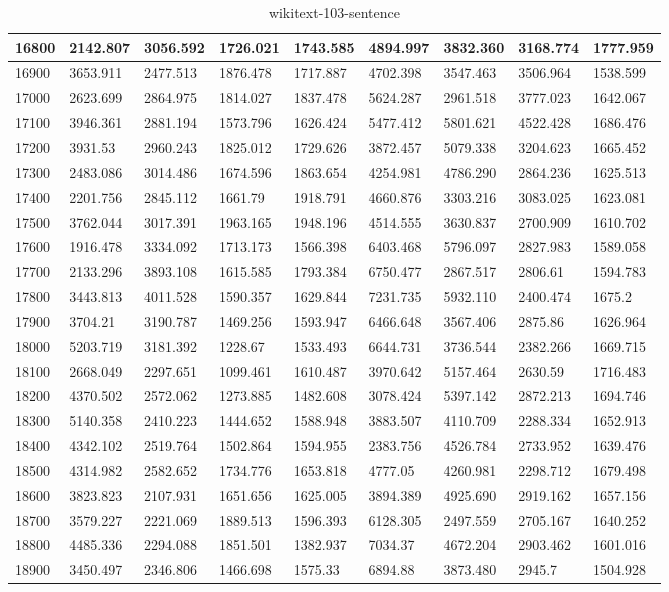 \begin{table}[]
{\begin{tabular}{|l|l|l|l|l|l|l|l|l|}
16800 & 2142.807 & 3056.592 & 1726.021 & 1743.585 & 4894.997 & 3832.360 & 3168.774 & 1777.959 \\ \hline
16900 & 3653.911 & 2477.513 & 1876.478 & 1717.887 & 4702.398 & 3547.463 & 3506.964 & 1538.599 \\ \hline
17000 & 2623.699 & 2864.975 & 1814.027 & 1837.478 & 5624.287 & 2961.518 & 3777.023 & 1642.067 \\ \hline
17100 & 3946.361 & 2881.194 & 1573.796 & 1626.424 & 5477.412 & 5801.621 & 4522.428 & 1686.476 \\ \hline
17200 & 3931.53 & 2960.243 & 1825.012 & 1729.626 & 3872.457 & 5079.338 & 3204.623 & 1665.452 \\ \hline
17300 & 2483.086 & 3014.486 & 1674.596 & 1863.654 & 4254.981 & 4786.290 & 2864.236 & 1625.513 \\ \hline
17400 & 2201.756 & 2845.112 & 1661.79 & 1918.791 & 4660.876 & 3303.216 & 3083.025 & 1623.081 \\ \hline
17500 & 3762.044 & 3017.391 & 1963.165 & 1948.196 & 4514.555 & 3630.837 & 2700.909 & 1610.702 \\ \hline
17600 & 1916.478 & 3334.092 & 1713.173 & 1566.398 & 6403.468 & 5796.097 & 2827.983 & 1589.058 \\ \hline
17700 & 2133.296 & 3893.108 & 1615.585 & 1793.384 & 6750.477 & 2867.517 & 2806.61 & 1594.783 \\ \hline
17800 & 3443.813 & 4011.528 & 1590.357 & 1629.844 & 7231.735 & 5932.110 & 2400.474 & 1675.2 \\ \hline
17900 & 3704.21 & 3190.787 & 1469.256 & 1593.947 & 6466.648 & 3567.406 & 2875.86 & 1626.964 \\ \hline
18000 & 5203.719 & 3181.392 & 1228.67 & 1533.493 & 6644.731 & 3736.544 & 2382.266 & 1669.715 \\ \hline
18100 & 2668.049 & 2297.651 & 1099.461 & 1610.487 & 3970.642 & 5157.464 & 2630.59 & 1716.483 \\ \hline
18200 & 4370.502 & 2572.062 & 1273.885 & 1482.608 & 3078.424 & 5397.142 & 2872.213 & 1694.746 \\ \hline
18300 & 5140.358 & 2410.223 & 1444.652 & 1588.948 & 3883.507 & 4110.709 & 2288.334 & 1652.913 \\ \hline
18400 & 4342.102 & 2519.764 & 1502.864 & 1594.955 & 2383.756 & 4526.784 & 2733.952 & 1639.476 \\ \hline
18500 & 4314.982 & 2582.652 & 1734.776 & 1653.818 & 4777.05 & 4260.981 & 2298.712 & 1679.498 \\ \hline
18600 & 3823.823 & 2107.931 & 1651.656 & 1625.005 & 3894.389 & 4925.690 & 2919.162 & 1657.156 \\ \hline
18700 & 3579.227 & 2221.069 & 1889.513 & 1596.393 & 6128.305 & 2497.559 & 2705.167 & 1640.252 \\ \hline
18800 & 4485.336 & 2294.088 & 1851.501 & 1382.937 & 7034.37 & 4672.204 & 2903.462 & 1601.016 \\ \hline
18900 & 3450.497 & 2346.806 & 1466.698 & 1575.33 & 6894.88 & 3873.480 & 2945.7 & 1504.928 \\ \hline
\end{tabular}
}
\caption{wikitext-103-sentence}
\label{tab:wikitext-103-sentence}
\end{table}
